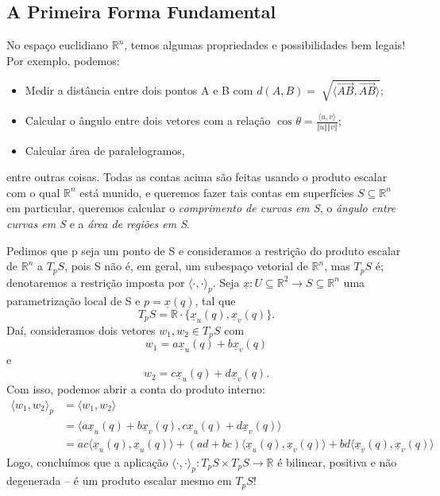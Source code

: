 \documentclass[../differential_geometry.tex]{subfiles}
\begin{document}
\subsection{A Primeira Forma Fundamental}
No espaço euclidiano \(\mathbb{R}^{n}\), temos algumas propriedades e possibilidades bem legais! Por exemplo, podemos:
\begin{itemize}
	\item Medir a distância entre dois pontos A e B com \(d(A, B) = \sqrt[]{\langle \vec{AB}, \vec{AB} \rangle};\)
	\item Calcular o ângulo entre dois vetores com a relação \(\displaystyle \cos^{}{\theta } = \frac{\langle u, v \rangle}{\Vert u \Vert\Vert v \Vert}\);
	\item Calcular área de paralelogramos,
\end{itemize}
entre outras coisas. Todas as contas acima são feitas usando o produto escalar com o qual \(\mathbb{R}^{n}\) está munido, e queremos fazer tais contas em superfícies \(S\subseteq \mathbb{R}^{n}\) em particular, queremos calcular o \textit{comprimento de curvas em S}, o \textit{ângulo entre curvas em S} e a \textit{área de regiões em S}.

Pedimos que p seja um ponto de S e consideramos a restrição do produto escalar de \(\mathbb{R}^{n}\) a \(T_{p}S\), pois S não é, em geral, um subespaço vetorial de \(\mathbb{R}^{n}\), mas \(T_{p}S\) é; denotaremos a restrição imposta por \(\langle \cdot , \cdot  \rangle_{p}\).
Seja \(\underline{x}:U \subseteq \mathbb{R}^{2}\rightarrow S \subseteq \mathbb{R}^{n}\) uma parametrização local de S e \(p = \underline{x}(q)\), tal que
\[
	T_{p}S = \mathbb{R}\cdot \{\underline{x}_{u}(q), \underline{x}_{v}(q)\}.
\]
Daí, consideramos dois vetores \(w_1, w_2\in T_{p}S\) com
\[
	w_1 = a\underline{x}_{u}(q) + b \underline{x}_{v}(q)
\]
e
\[
	w_2 = c\underline{x}_{u}(q) + d \underline{x}_{v}(q).
\]
Com isso, podemos abrir a conta do produto interno:
\begin{align*}
	\langle w_1, w_2 \rangle_{p} & = \langle w_1, w_2 \rangle                                                                                                                                                                          \\
	                             & = \langle a\underline{x}_{u}(q) + b \underline{x}_{v}(q), c\underline{x}_{u}(q) + d \underline{x}_{v}(q) \rangle                                                                                    \\
	                             & = ac \langle \underline{x}_{u}(q), \underline{x}_{u}(q) \rangle + (ad+bc)\langle \underline{x}_{u}(q), \underline{x}_{v}(q) \rangle + bd \langle \underline{x}_{v}(q), \underline{x}_{v}(q) \rangle
\end{align*}
Logo, concluímos que a aplicação \(\langle \cdot , \cdot  \rangle_{p}:T_{p}S \times T_{p}S\rightarrow \mathbb{R}\) é bilinear, positiva e não degenerada -- é um produto escalar mesmo em \(T_{p}S\)!
\end{document}
